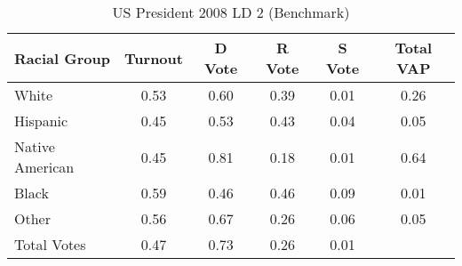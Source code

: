 \begin{table}[htb]
\begin{center}
\caption{US President 2008 LD 2 (Benchmark)}
\label{pres08_vap_ld_2_benchmark}
\begin{tabular}{lccccc}
  \hline
Racial Group & Turnout & D Vote & R Vote & S Vote & Total VAP \\ 
  \hline
White & 0.53 & 0.60 & 0.39 & 0.01 & 0.26 \\ 
  Hispanic & 0.45 & 0.53 & 0.43 & 0.04 & 0.05 \\ 
  Native American & 0.45 & 0.81 & 0.18 & 0.01 & 0.64 \\ 
  Black & 0.59 & 0.46 & 0.46 & 0.09 & 0.01 \\ 
  Other & 0.56 & 0.67 & 0.26 & 0.06 & 0.05 \\ 
  Total Votes & 0.47 & 0.73 & 0.26 & 0.01 &  \\ 
   \hline
\end{tabular}
\end{center}
\end{table}

